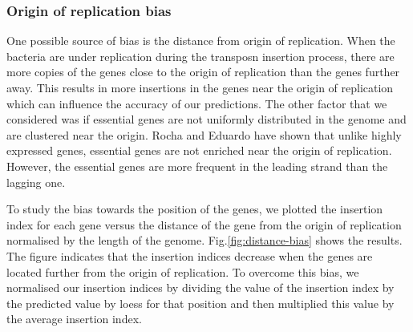 \documentclass[12pt,letterpaper]{article}
\begin{document}

\subsubsection{Origin of replication bias}
One possible source of bias is the distance from origin of replication. When the bacteria are under replication during the transposn insertion process, there are more copies of the genes close to the origin of replication than the genes further away. This results in more insertions in the genes near the origin of replication which can influence the accuracy of our predictions. The other factor that we considered was if essential genes are not uniformly distributed in the genome and are clustered near the origin. Rocha and Eduardo \cite{rocha_replication-related_2004} have shown that unlike highly expressed genes, essential genes are not enriched near the origin of replication. However, the essential genes are more frequent in the leading strand than the lagging one.

To study the bias towards the position of the genes, we plotted the insertion index for each gene versus the distance of the gene from the origin of replication normalised by the length of the genome. Fig.\@ \ref{fig:distance-bias} shows the results. The figure indicates that the insertion indices decrease when the genes are located further from the origin of replication. To overcome this bias, we normalised our insertion indices by dividing the value of the insertion index by the predicted value by loess for that position and then multiplied this value by the average insertion index.
\end{document}
